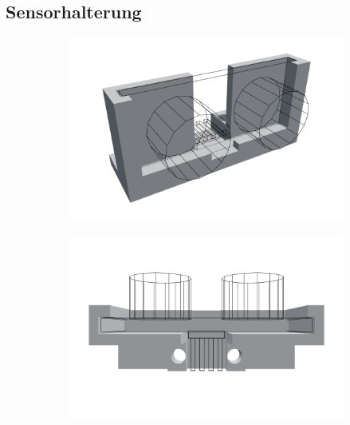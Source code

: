 \documentclass[a4paper, 12pt]{scrartcl}
\begin{document}
\subsection{Sensorhalterung}
\begin{figure}[ht!] \centering
	\begin{subfigure}{.5\textwidth} \centering
		\includegraphics[width=\textwidth]{../3D-Druck_Modelle/Sensorhalterung.png}
	\end{subfigure}%
	\begin{subfigure}{.5\textwidth} \centering
		\includegraphics[width=\textwidth]{../3D-Druck_Modelle/Sensorhalterung_Top.png}
	\end{subfigure}\\
	\begin{subfigure}{.5\textwidth} \centering

\end{subfigure}
\end{figure}
\end{document}
